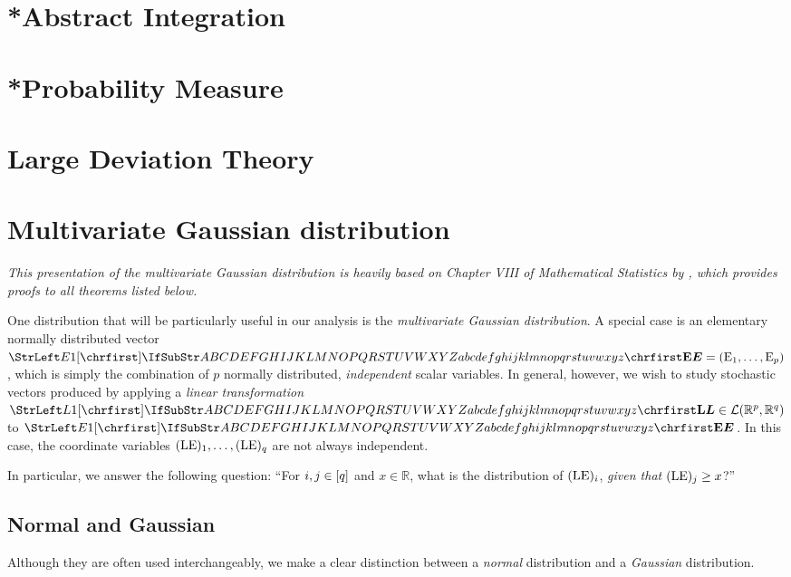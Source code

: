 \documentclass[main.tex]{subfiles}
\begin{document}
\section{*Abstract Integration}
\section{*Probability Measure}
\section{Large Deviation Theory}

\section{Multivariate Gaussian distribution}
\emph{This presentation of the multivariate Gaussian distribution is heavily based on Chapter VIII of \emph{Mathematical Statistics} by \cite{Pestman1998}, which provides proofs to all theorems listed below.}

One distribution that will be particularly useful in our analysis is the \emph{multivariate Gaussian distribution}. A special case is an elementary normally distributed vector $\mat{E}=(\mel{E}_1, \dots, \mel{E}_p)$, which is simply the combination of $p$ normally distributed, \emph{independent} scalar variables. In general, however, we wish to study stochastic vectors produced by applying a \emph{linear transformation} $\mat{L} \in \mathcal{L}(\mathbb{R}^p, \mathbb{R}^q)$ to $\mat{E}$. In this case, the coordinate variables $({\mathrm{LE}})_1,\dots,({\mathrm{LE}})_q$ are not always independent. 

In particular, we answer the following question: ``For $i,j \in [q]$ and $x \in \mathbb{R}$, what is the distribution of $({\mathrm{LE}})_i$, \emph{given that} $({\mathrm{LE}})_j \geq x$?''

\subsection{Normal and Gaussian}
Although they are often used interchangeably, we make a clear distinction between a \emph{normal} distribution and a \emph{Gaussian} distribution. 
\end{document}
